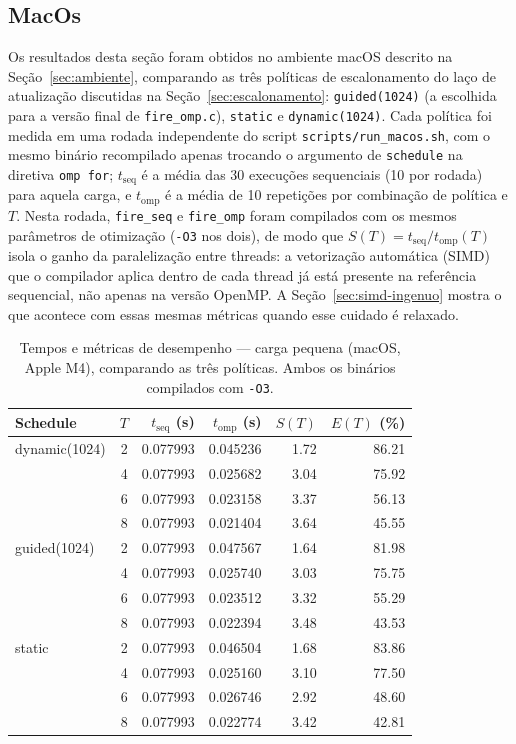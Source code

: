\documentclass[12pt,a4paper]{article}
\begin{document}
\subsection{MacOs}
Os resultados desta seção foram obtidos no ambiente macOS descrito na
Seção~\ref{sec:ambiente}, comparando as três políticas de escalonamento
do laço de atualização discutidas na Seção~\ref{sec:escalonamento}:
\texttt{guided(1024)} (a escolhida para a versão final de
\texttt{fire\_omp.c}), \texttt{static} e \texttt{dynamic(1024)}. Cada
política foi medida em uma rodada independente do script
\texttt{scripts/run\_macos.sh}, com o mesmo binário recompilado apenas
trocando o argumento de \texttt{schedule} na diretiva \texttt{omp for};
$t_{\mathrm{seq}}$ é a média das 30 execuções sequenciais (10 por
rodada) para aquela carga, e $t_{\mathrm{omp}}$ é a média de 10
repetições por combinação de política e $T$. Nesta rodada,
\texttt{fire\_seq} e \texttt{fire\_omp} foram compilados com os mesmos
parâmetros de otimização (\texttt{-O3} nos dois), de modo que
$S(T)=t_{\mathrm{seq}}/t_{\mathrm{omp}}(T)$ isola o ganho da
paralelização entre threads: a vetorização automática (SIMD) que o
compilador aplica dentro de cada thread já está presente na referência
sequencial, não apenas na versão OpenMP. A Seção~\ref{sec:simd-ingenuo}
mostra o que acontece com essas mesmas métricas quando esse cuidado é
relaxado. 

\begin{table}[H]
\centering\small
\caption{Tempos e métricas de desempenho --- carga pequena (macOS, Apple M4), comparando as três políticas. Ambos os binários compilados com \texttt{-O3}.}
\begin{tabular}{lrrrrr}
\toprule
\textbf{Schedule} & $T$ & $t_{\mathrm{seq}}$ (s) & $t_{\mathrm{omp}}$ (s) & $S(T)$ & $E(T)$ (\%) \\
\midrule
dynamic(1024) & 2 & 0.077993 & 0.045236 & 1.72 & 86.21 \\
              & 4 & 0.077993 & 0.025682 & 3.04 & 75.92 \\
              & 6 & 0.077993 & 0.023158 & 3.37 & 56.13 \\
              & 8 & 0.077993 & 0.021404 & 3.64 & 45.55 \\
\midrule
guided(1024)  & 2 & 0.077993 & 0.047567 & 1.64 & 81.98 \\
              & 4 & 0.077993 & 0.025740 & 3.03 & 75.75 \\
              & 6 & 0.077993 & 0.023512 & 3.32 & 55.29 \\
              & 8 & 0.077993 & 0.022394 & 3.48 & 43.53 \\
\midrule
static        & 2 & 0.077993 & 0.046504 & 1.68 & 83.86 \\
              & 4 & 0.077993 & 0.025160 & 3.10 & 77.50 \\
              & 6 & 0.077993 & 0.026746 & 2.92 & 48.60 \\
              & 8 & 0.077993 & 0.022774 & 3.42 & 42.81 \\
\bottomrule
\end{tabular}
\end{table}
\end{document}
